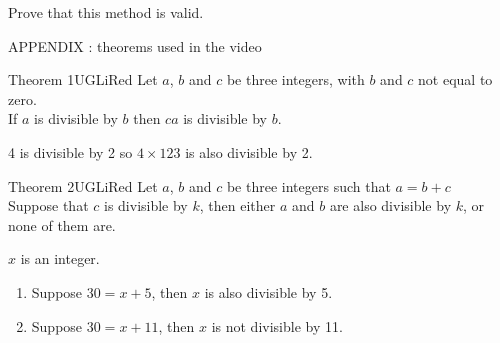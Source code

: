 \documentclass[12pt,a4paper,eval,english,firamath]{nsi}
\begin{document}
Prove that this method is valid.\\


\newpage
{\LARGE\color{UGLiRed!50}\titlefont APPENDIX : theorems used in the video}\\



\begin{encadrecolore}{Theorem 1}{UGLiRed}
    Let $a$, $b$ and $c$ be three integers, with $b$ and $c$ not equal to zero.\\

    If $a$ is divisible by $b$ then $ca$ is divisible by $b$.
\end{encadrecolore}


\begin{exemple}[]
    4 is divisible by 2 so $4\times 123$ is also divisible by 2.
\end{exemple}

\begin{encadrecolore}{Theorem 2}{UGLiRed}
    Let $a$, $b$ and $c$ be three integers such that $a = b + c$\\
    Suppose that $c$ is divisible by $k$, then either $a$ and $b$ are also divisible by $k$, or none of them are.
\end{encadrecolore}

\begin{exemple}[]
    $x$ is an integer.
    \begin{enumerate}
        \item Suppose $30 = x + 5$, then $x$ is also divisible by 5.
        \item Suppose $30 = x + 11$, then $x$ is not divisible by 11.
    \end{enumerate}
\end{exemple}
\end{document}
